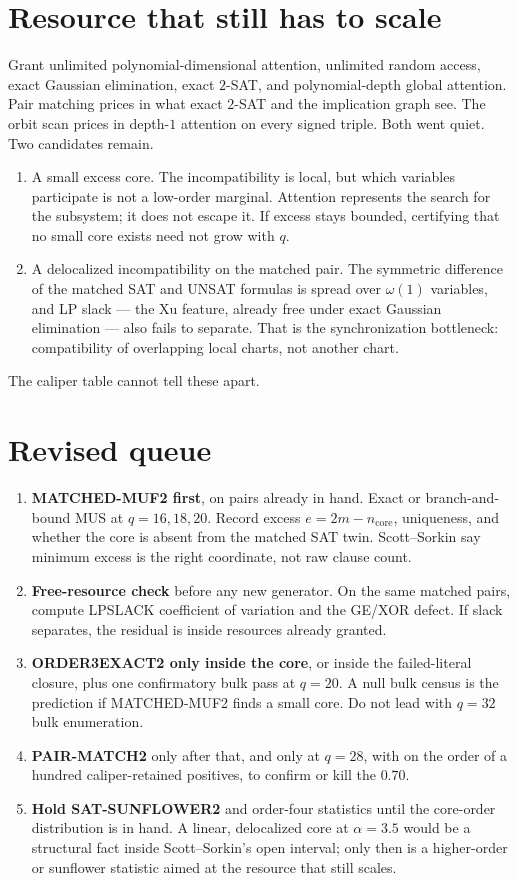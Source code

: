 \documentclass[11pt]{article}
\begin{document}
\section{Resource that still has to scale}
Grant unlimited polynomial-dimensional attention, unlimited random access, exact Gaussian elimination, exact \(2\)-SAT, and polynomial-depth global attention. Pair matching prices in what exact \(2\)-SAT and the implication graph see. The orbit scan prices in depth-\(1\) attention on every signed triple. Both went quiet. Two candidates remain.

\begin{enumerate}
\item A small excess core. The incompatibility is local, but which variables participate is not a low-order marginal. Attention represents the search for the subsystem; it does not escape it. If excess stays bounded, certifying that no small core exists need not grow with \(q\).
\item A delocalized incompatibility on the matched pair. The symmetric difference of the matched SAT and UNSAT formulas is spread over \(\omega(1)\) variables, and LP slack --- the Xu feature, already free under exact Gaussian elimination --- also fails to separate. That is the synchronization bottleneck: compatibility of overlapping local charts, not another chart.
\end{enumerate}
The caliper table cannot tell these apart.

\section{Revised queue}
\begin{enumerate}
\item \textbf{MATCHED-MUF2 first}, on pairs already in hand. Exact or branch-and-bound MUS at \(q=16,18,20\). Record excess \(e=2m-n_{\mathrm{core}}\), uniqueness, and whether the core is absent from the matched SAT twin. Scott--Sorkin say minimum excess is the right coordinate, not raw clause count.
\item \textbf{Free-resource check} before any new generator. On the same matched pairs, compute LPSLACK coefficient of variation and the GE/XOR defect. If slack separates, the residual is inside resources already granted.
\item \textbf{ORDER3EXACT2 only inside the core}, or inside the failed-literal closure, plus one confirmatory bulk pass at \(q=20\). A null bulk census is the prediction if MATCHED-MUF2 finds a small core. Do not lead with \(q=32\) bulk enumeration.
\item \textbf{PAIR-MATCH2} only after that, and only at \(q=28\), with on the order of a hundred caliper-retained positives, to confirm or kill the \(0.70\).
\item \textbf{Hold SAT-SUNFLOWER2} and order-four statistics until the core-order distribution is in hand. A linear, delocalized core at \(\alpha=3.5\) would be a structural fact inside Scott--Sorkin's open interval; only then is a higher-order or sunflower statistic aimed at the resource that still scales.
\end{enumerate}
\end{document}
